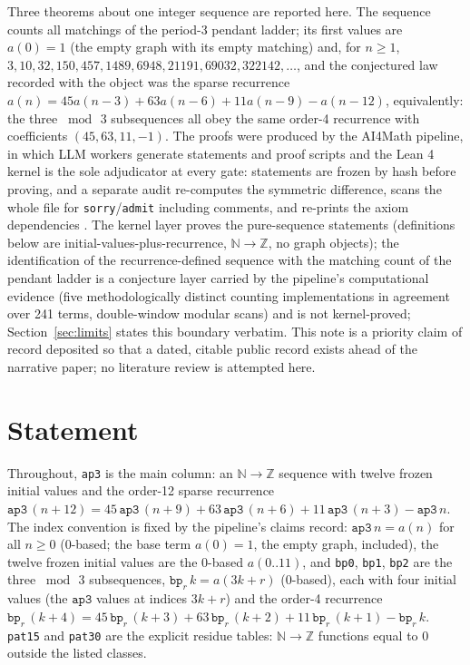 \documentclass[11pt]{article}
\begin{document}
Three theorems about one integer sequence are reported here. The sequence
counts all matchings of the period-3 pendant ladder; its first values are
$a(0)=1$ (the empty graph with its empty matching) and, for $n\ge 1$,
$3,10,32,150,457,1489,6948,21191,69032,322142,\ldots$, and the conjectured
law recorded with the object was the sparse recurrence
$a(n)=45a(n-3)+63a(n-6)+11a(n-9)-a(n-12)$, equivalently: the three
$\bmod\,3$ subsequences all obey the same order-4 recurrence with
coefficients $(45,63,11,-1)$. The proofs were produced by the AI4Math
pipeline, in which LLM workers generate statements and proof scripts and the
Lean 4 kernel is the sole adjudicator at every gate: statements are frozen
by hash before proving, and a separate audit re-computes the symmetric
difference, scans the whole file for \texttt{sorry}/\texttt{admit} including
comments, and re-prints the axiom dependencies \cite{lean4}. The kernel
layer proves the pure-sequence statements (definitions below are
initial-values-plus-recurrence, $\mathbb{N}\to\mathbb{Z}$, no graph objects);
the identification of the recurrence-defined sequence with the matching
count of the pendant ladder is a conjecture layer carried by the pipeline's
computational evidence (five methodologically distinct counting
implementations in agreement over 241 terms, double-window modular scans)
and is not kernel-proved; Section~\ref{sec:limits} states this boundary
verbatim. This note is a priority claim of record deposited so that a dated,
citable public record exists ahead of the narrative paper; no literature
review is attempted here.

\section{Statement}\label{sec:statement}

Throughout, \texttt{ap3} is the main column: an
$\mathbb{N}\to\mathbb{Z}$ sequence with twelve frozen initial values and the
order-12 sparse recurrence
$\mathtt{ap3}\,(n+12)=45\,\mathtt{ap3}\,(n+9)+63\,\mathtt{ap3}\,(n+6)
+11\,\mathtt{ap3}\,(n+3)-\mathtt{ap3}\,n$. The index convention is fixed by
the pipeline's claims record: $\mathtt{ap3}\,n=a(n)$ for all
$n\ge 0$ ($0$-based; the base term $a(0)=1$, the empty graph, included), the twelve
frozen initial values are the 0-based $a(0..11)$, and \texttt{bp0}, \texttt{bp1},
\texttt{bp2} are the three $\bmod\,3$ subsequences, $\mathtt{bp}_r\,k
=a(3k{+}r)$ ($0$-based), each with four initial values (the
$\mathtt{ap3}$ values at indices $3k+r$) and the order-4 recurrence
$\mathtt{bp}_r\,(k+4)=45\,\mathtt{bp}_r\,(k+3)+63\,\mathtt{bp}_r\,(k+2)
+11\,\mathtt{bp}_r\,(k+1)-\mathtt{bp}_r\,k$. \texttt{pat15} and
\texttt{pat30} are the explicit residue tables: $\mathbb{N}\to\mathbb{Z}$
functions equal to $0$ outside the listed classes.
\end{document}
